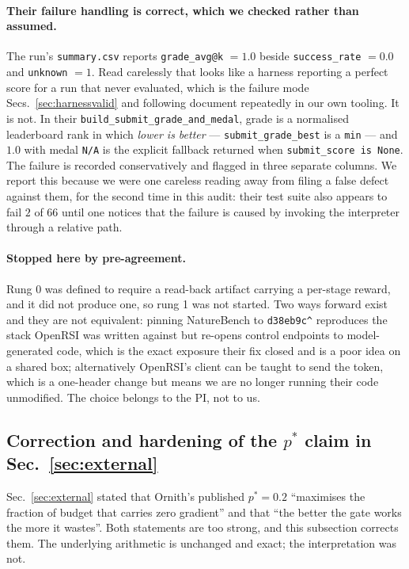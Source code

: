 \paragraph{Their failure handling is correct, which we checked rather than assumed.} The
run's \texttt{summary.csv} reports \texttt{grade\_avg@k} $=1.0$ beside
\texttt{success\_rate} $=0.0$ and \texttt{unknown} $=1$. Read carelessly that looks like a
harness reporting a perfect score for a run that never evaluated, which is the failure mode
Secs.~\ref{sec:harnessvalid} and following document repeatedly in our own tooling. It is
not. In their \texttt{build\_submit\_grade\_and\_medal}, grade is a normalised leaderboard
rank in which \emph{lower is better} --- \texttt{submit\_grade\_best} is a \texttt{min} ---
and $1.0$ with medal \texttt{N/A} is the explicit fallback returned when
\texttt{submit\_score is None}. The failure is recorded conservatively and flagged in three
separate columns. We report this because we were one careless reading away from filing a
false defect against them, for the second time in this audit: their test suite also appears
to fail $2$ of $66$ until one notices that the failure is caused by invoking the
interpreter through a relative path.

\paragraph{Stopped here by pre-agreement.} Rung 0 was defined to require a read-back
artifact carrying a per-stage reward, and it did not produce one, so rung 1 was not
started. Two ways forward exist and they are not equivalent: pinning NatureBench to
\texttt{d38eb9c\^{}} reproduces the stack OpenRSI was written against but re-opens control
endpoints to model-generated code, which is the exact exposure their fix closed and is a
poor idea on a shared box; alternatively OpenRSI's client can be taught to send the token,
which is a one-header change but means we are no longer running their code unmodified. The
choice belongs to the PI, not to us.

\subsection{Correction and hardening of the $p^*$ claim in
Sec.~\ref{sec:external}}
\label{sec:pstarcorrection}

Sec.~\ref{sec:external} stated that Ornith's published $p^*=0.2$ ``maximises the fraction
of budget that carries zero gradient'' and that ``the better the gate works the more it
wastes''. Both statements are too strong, and this subsection corrects them. The
underlying arithmetic is unchanged and exact; the interpretation was not.


